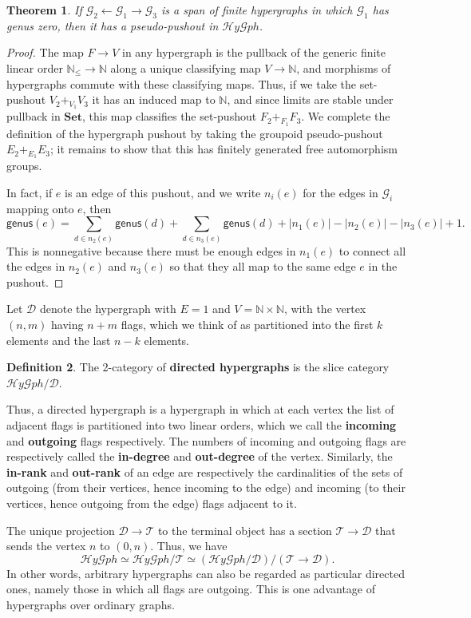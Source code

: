 \documentclass{article}
\newtheorem{thm}{Theorem}[section]
\theoremstyle{definition}
\newtheorem{defn}[thm]{Definition}
\theoremstyle{remark}
\def\G{\mathcal{G}}
\def\Set{\mathbf{Set}}
\let\ot\leftarrow
\def\genus{\mathsf{genus}}
\def\N{\mathbb{N}}
\def\hy{\mathcal{H}\mathit{y}\mathcal{G}\mathit{ph}}
\def\thy{\mathcal{T}}
\def\dhy{\mathcal{D}}
\begin{document}
\begin{thm}\label{thm:pushout}
  If $\G_2 \ot \G_1 \to \G_3$ is a span of finite hypergraphs in which $\G_1$ has genus zero, then it has a pseudo-pushout in $\hy$.
\end{thm}
\begin{proof}
  The map $F\to V$ in any hypergraph is the pullback of the generic finite linear order $\N_\le \to \N$ along a unique classifying map $V\to\N$, and morphisms of hypergraphs commute with these classifying maps.
  Thus, if we take the set-pushout $V_2 +_{V_1} V_3$ it has an induced map to $\N$, and since limits are stable under pullback in $\Set$, this map classifies the set-pushout $F_2 +_{F_1} F_3$.
  We complete the definition of the hypergraph pushout by taking the groupoid pseudo-pushout $E_2 +_{E_1} E_3$; it remains to show that this has finitely generated free automorphism groups.

  In fact, if $e$ is an edge of this pushout, and we write $n_i(e)$ for the edges in $\G_i$ mapping onto $e$, then
  \[ \genus(e) = \sum_{d\in n_2(e)} \genus(d) + \sum_{d\in n_3(e)} \genus(d) + |n_1(e)| - |n_2(e)| - |n_3(e)| + 1. \]
  This is nonnegative because there must be enough edges in $n_1(e)$ to connect all the edges in $n_2(e)$ and $n_3(e)$ so that they all map to the same edge $e$ in the pushout.
\end{proof}

Let $\dhy$ denote the hypergraph with $E=1$ and $V=\N\times \N$, with the vertex $(n,m)$ having $n+m$ flags, which we think of as partitioned into the first $k$ elements and the last $n-k$ elements.

\begin{defn}
  The 2-category of \textbf{directed hypergraphs} is the slice category $\hy/\dhy$.
\end{defn}

Thus, a directed hypergraph is a hypergraph in which at each vertex the list of adjacent flags is partitioned into two linear orders, which we call the \textbf{incoming} and \textbf{outgoing} flags respectively.
The numbers of incoming and outgoing flags are respectively called the \textbf{in-degree} and \textbf{out-degree} of the vertex.
Similarly, the \textbf{in-rank} and \textbf{out-rank} of an edge are respectively the cardinalities of the sets of outgoing (from their vertices, hence incoming to the edge) and incoming (to their vertices, hence outgoing from the edge) flags adjacent to it.

The unique projection $\dhy\to\thy$ to the terminal object has a section $\thy\to\dhy$ that sends the vertex $n$ to $(0,n)$.
Thus, we have
\[\hy \simeq \hy/\thy \simeq (\hy/\dhy)/(\thy\to\dhy).\]
In other words, arbitrary hypergraphs can also be regarded as particular directed ones, namely those in which all flags are outgoing.
This is one advantage of hypergraphs over ordinary graphs.
\end{document}
